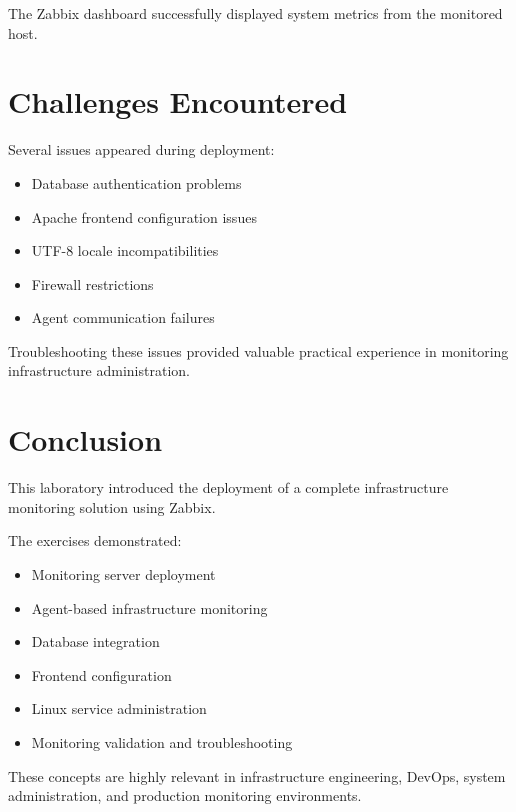 \documentclass[11pt,a4paper]{article}
\begin{document}
The Zabbix dashboard successfully displayed system metrics from the monitored host.

\section{Challenges Encountered}

Several issues appeared during deployment:
\begin{itemize}
    \item Database authentication problems
    \item Apache frontend configuration issues
    \item UTF-8 locale incompatibilities
    \item Firewall restrictions
    \item Agent communication failures
\end{itemize}

Troubleshooting these issues provided valuable practical experience in monitoring infrastructure administration.

\section{Conclusion}

This laboratory introduced the deployment of a complete infrastructure monitoring solution using Zabbix.

The exercises demonstrated:
\begin{itemize}
    \item Monitoring server deployment
    \item Agent-based infrastructure monitoring
    \item Database integration
    \item Frontend configuration
    \item Linux service administration
    \item Monitoring validation and troubleshooting
\end{itemize}

These concepts are highly relevant in infrastructure engineering, DevOps, system administration, and production monitoring environments.
\end{document}
